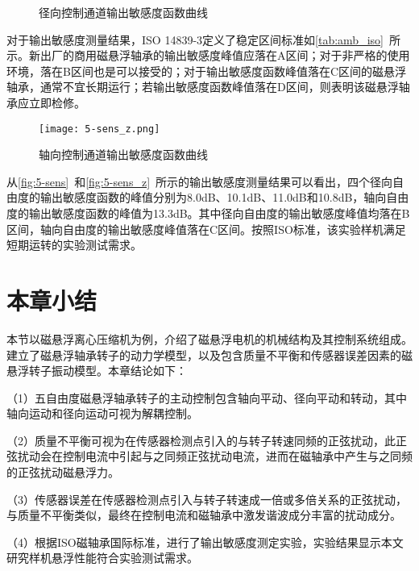 \documentclass[
  lang=cn,
  degree=master,
  openany,oneside
]{nuaathesis}
\begin{document}
\begin{figure}[H]  
	\quad  
	\quad  	
	\quad  
	\quad  			
	\caption{径向控制通道输出敏感度函数曲线}  \label{fig:5-sens}
\end{figure}

对于输出敏感度测量结果，ISO 14839-3定义了稳定区间标准如\autoref{tab:amb_iso}~所示。新出厂的商用磁悬浮轴承的输出敏感度峰值应落在A区间；对于非严格的使用环境，落在B区间也是可以接受的；对于输出敏感度函数峰值落在C区间的磁悬浮轴承，通常不宜长期运行；若输出敏感度函数峰值落在D区间，则表明该磁悬浮轴承应立即检修。

\begin{figure}[H]
	\texttt{[image: 5-sens\_z.png]}
	\caption{轴向控制通道输出敏感度函数曲线}
	\label{fig:5-sens_z}
\end{figure}

从\autoref{fig:5-sens}~和\autoref{fig:5-sens_z}~所示的输出敏感度测量结果可以看出，四个径向自由度的输出敏感度函数的峰值分别为8.0dB、10.1dB、11.0dB和10.8dB，轴向自由度的输出敏感度函数的峰值为13.3dB。其中径向自由度的输出敏感度峰值均落在B区间，轴向自由度的输出敏感度峰值落在C区间。按照ISO标准，该实验样机满足短期运转的实验测试需求。

\section{本章小结}
本节以磁悬浮离心压缩机为例，介绍了磁悬浮电机的机械结构及其控制系统组成。建立了磁悬浮轴承转子的动力学模型，以及包含质量不平衡和传感器误差因素的磁悬浮转子振动模型。本章结论如下：

（1）五自由度磁悬浮轴承转子的主动控制包含轴向平动、径向平动和转动，其中轴向运动和径向运动可视为解耦控制。

（2）质量不平衡可视为在传感器检测点引入的与转子转速同频的正弦扰动，此正弦扰动会在控制电流中引起与之同频正弦扰动电流，进而在磁轴承中产生与之同频的正弦扰动磁悬浮力。

（3）传感器误差在传感器检测点引入与转子转速成一倍或多倍关系的正弦扰动，与质量不平衡类似，最终在控制电流和磁轴承中激发谐波成分丰富的扰动成分。

（4）根据ISO磁轴承国际标准，进行了输出敏感度测定实验，实验结果显示本文研究样机悬浮性能符合实验测试需求。
\end{document}
